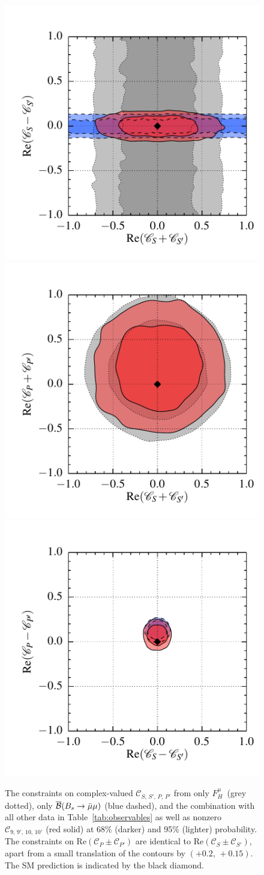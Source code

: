\documentclass[twocolumn,epjc3]{svjour3}
\numberwithin{equation}{section}
\def \reftab#1{Table~\ref{#1}}
\newcommand{\wilson}[2][{}]{\mathcal{C}_{#2}^{\mathrm{#1}}}
\renewcommand{\[}{\big[}
\renewcommand{\]}{\big]}
\renewcommand{\(}{\big(}
\renewcommand{\)}{\big)}
\begin{document}
\begin{figure}
  \begin{center}
    \includegraphics[width=.325\textwidth]{plots/pdf/scSP_FH,scSP_Bsmumu,sc910SP_K_KstarBR_Bsmumu_0,2}
    \includegraphics[width=.325\textwidth]{plots/pdf/scSP_FH,sc910SP_K_KstarBR_Bsmumu_0,4}
    \includegraphics[width=.325\textwidth]{plots/pdf/scSP_Bsmumu,sc910SP_K_KstarBR_Bsmumu_2,6}
  \end{center}
  \caption{ The constraints on complex-valued
    $\wilson{S,\,S',\,P,\,P'}$ from only $F_H^\mu$~(grey dotted), only
    $\overline{\cal B}(B_s \to \bar\mu\mu)$ (blue dashed), and the
    combination with all other data in \reftab{tab:observables} as
    well as nonzero $\wilson[]{9,\,9',\,10,\, 10'}$ (red solid) at
    68\% (darker) and 95\% (lighter) probability. The constraints on
    Re$(\wilson{P} \pm \wilson{P'})$ are identical to Re$(\wilson{S}
    \pm \wilson{S'})$, apart from a small translation of the contours
    by $(+0.2,\, +0.15)$. The SM prediction is indicated by the black
    diamond. }
  \label{fig:scalar}
\end{figure}
\end{document}
